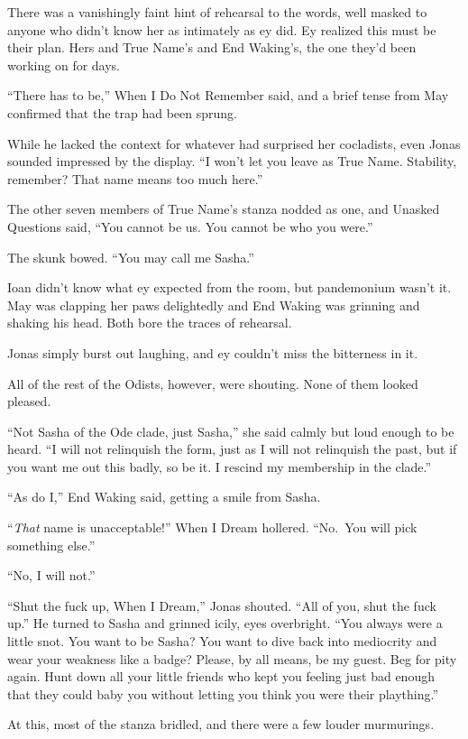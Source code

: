 There was a vanishingly faint hint of rehearsal to the words, well masked to anyone who didn't know her as intimately as ey did. Ey realized this must be their plan. Hers and True Name's and End Waking's, the one they'd been working on for days.

``There has to be,'' When I Do Not Remember said, and a brief tense from May confirmed that the trap had been sprung.

While he lacked the context for whatever had surprised her cocladists, even Jonas sounded impressed by the display. ``I won't let you leave as True Name. Stability, remember? That name means too much here.''

The other seven members of True Name's stanza nodded as one, and Unasked Questions said, ``You cannot be us. You cannot be who you were.''

The skunk bowed. ``You may call me Sasha.''

Ioan didn't know what ey expected from the room, but pandemonium wasn't it. May was clapping her paws delightedly and End Waking was grinning and shaking his head. Both bore the traces of rehearsal.

Jonas simply burst out laughing, and ey couldn't miss the bitterness in it.

All of the rest of the Odists, however, were shouting. None of them looked pleased.

``Not Sasha of the Ode clade, just Sasha,'' she said calmly but loud enough to be heard. ``I will not relinquish the form, just as I will not relinquish the past, but if you want me out this badly, so be it. I rescind my membership in the clade.''

``As do I,'' End Waking said, getting a smile from Sasha.

``\emph{That} name is unacceptable!'' When I Dream hollered. ``No.~You will pick something else.''

``No, I will not.''

``Shut the fuck up, When I Dream,'' Jonas shouted. ``All of you, shut the fuck up.'' He turned to Sasha and grinned icily, eyes overbright. ``You always were a little snot. You want to be Sasha? You want to dive back into mediocrity and wear your weakness like a badge? Please, by all means, be my guest. Beg for pity again. Hunt down all your little friends who kept you feeling just bad enough that they could baby you without letting you think you were their plaything.''

At this, most of the stanza bridled, and there were a few louder murmurings.

